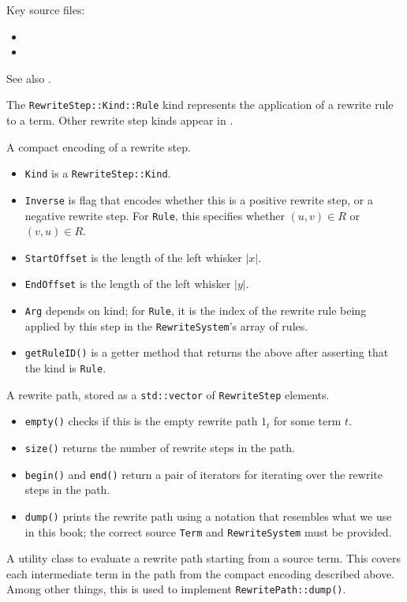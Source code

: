 \documentclass[../generics]{subfiles}
\begin{document}
Key source files:
\begin{itemize}
\item {}
\item {}
\end{itemize}
See also .

The \texttt{RewriteStep::Kind::Rule} kind represents the application of a rewrite rule to a term. Other rewrite step kinds appear in .

A compact encoding of a rewrite step.
\begin{itemize}
\item \texttt{Kind} is a \texttt{RewriteStep::Kind}.
\item \texttt{Inverse} is flag that encodes whether this is a positive rewrite step, or a negative rewrite step. For \texttt{Rule}, this specifies whether $(u,v)\in R$ or $(v,u)\in R$.
\item \texttt{StartOffset} is the length of the left whisker $|x|$.
\item \texttt{EndOffset} is the length of the left whisker $|y|$.
\item \texttt{Arg} depends on kind; for \texttt{Rule}, it is the index of the rewrite rule being applied by this step in the \texttt{RewriteSystem}'s array of rules.
\item \texttt{getRuleID()} is a getter method that returns the above after asserting that the kind is \texttt{Rule}.
\end{itemize}

A rewrite path, stored as a \texttt{std::vector} of \texttt{RewriteStep} elements.

\begin{itemize}
\item \texttt{empty()} checks if this is the empty rewrite path $1_t$ for some term $t$.
\item \texttt{size()} returns the number of rewrite steps in the path.
\item \texttt{begin()} and \texttt{end()} return a pair of iterators for iterating over the rewrite steps in the path.
\item \texttt{dump()} prints the rewrite path using a notation that resembles what we use in this book; the correct source \texttt{Term} and \texttt{RewriteSystem} must be provided.
\end{itemize}

A utility class to evaluate a rewrite path starting from a source term. This covers each intermediate term in the path from the compact encoding described above. Among other things, this is used to implement \texttt{RewritePath::dump()}.
\end{document}
